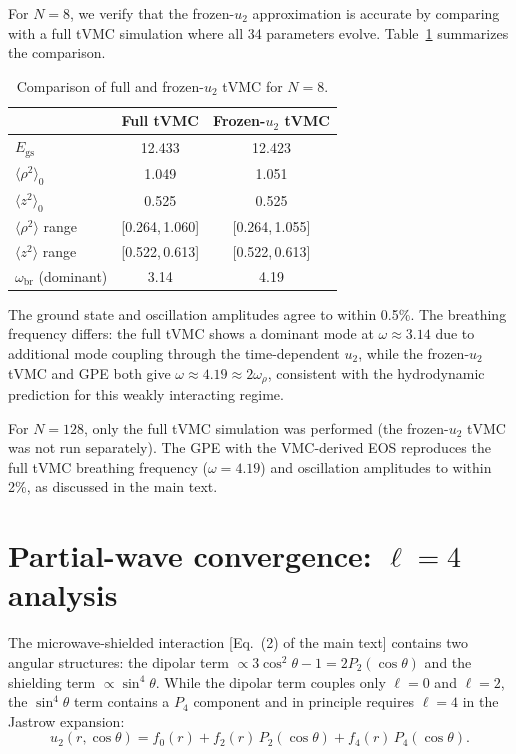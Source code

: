 \documentclass[aps,prl,onecolumn,superscriptaddress,longbibliography,nofootinbib]{revtex4-2}
\newcommand{\avg}[1]{\langle #1 \rangle}
\begin{document}
For $N=8$, we verify that the frozen-$u_2$ approximation is accurate
by comparing with a full tVMC simulation where all 34 parameters
evolve.  Table~\ref{tab:full_frozen} summarizes the comparison.

\begin{table}[h]
\caption{Comparison of full and frozen-$u_2$ tVMC for $N=8$.}
\label{tab:full_frozen}
\begin{ruledtabular}
\begin{tabular}{lcc}
& Full tVMC & Frozen-$u_2$ tVMC\\
\hline
$E_{\mathrm{gs}}$ & 12.433 & 12.423\\
$\avg{\rho^2}_0$ & 1.049 & 1.051\\
$\avg{z^2}_0$ & 0.525 & 0.525\\
$\avg{\rho^2}$ range & [0.264,\,1.060] & [0.264,\,1.055]\\
$\avg{z^2}$ range & [0.522,\,0.613] & [0.522,\,0.613]\\
$\omega_{\mathrm{br}}$ (dominant) & 3.14 & 4.19\\
\end{tabular}
\end{ruledtabular}
\end{table}

The ground state and oscillation amplitudes agree to within 0.5\%.
The breathing frequency differs: the full tVMC shows a dominant mode
at $\omega\approx 3.14$ due to additional mode coupling through the
time-dependent $u_2$, while the frozen-$u_2$ tVMC and GPE both give
$\omega\approx 4.19\approx 2\omega_\rho$, consistent with the
hydrodynamic prediction for this weakly interacting regime.

For $N=128$, only the full tVMC simulation was performed (the
frozen-$u_2$ tVMC was not run separately).  The GPE with the
VMC-derived EOS reproduces the full tVMC breathing frequency
($\omega=4.19$) and oscillation amplitudes to within 2\%, as
discussed in the main text.

\section{Partial-wave convergence: $\ell=4$ analysis}
\label{sec:l4}

The microwave-shielded interaction [Eq.~(2) of the main text] contains
two angular structures: the dipolar term $\propto 3\cos^2\!\theta-1 =
2P_2(\cos\theta)$ and the shielding term $\propto \sin^4\!\theta$.
While the dipolar term couples only $\ell=0$ and $\ell=2$, the
$\sin^4\!\theta$ term contains a $P_4$ component and in principle
requires $\ell=4$ in the Jastrow expansion:
\begin{equation}
u_2(r,\cos\theta) = f_0(r) + f_2(r)\,P_2(\cos\theta)
+ f_4(r)\,P_4(\cos\theta).
\end{equation}
\end{document}
